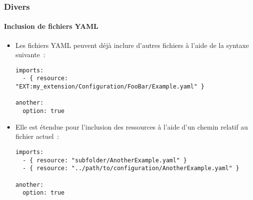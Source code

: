 
\begin{frame}[fragile]
	\frametitle{Divers}
	\framesubtitle{Inclusion de fichiers YAML}

	\lstset{basicstyle=\tiny\ttfamily}

	\begin{itemize}
		\item Les fichiers YAML peuvent déjà inclure d'autres fichiers à l'aide de la syntaxe suivante~:

\begin{lstlisting}
imports:
  - { resource: "EXT:my_extension/Configuration/FooBar/Example.yaml" }

another:
  option: true
\end{lstlisting}

		\item Elle est étendue pour l'inclusion des ressources à l'aide d'un chemin relatif au fichier actuel~:

\begin{lstlisting}
imports:
  - { resource: "subfolder/AnotherExample.yaml" }
  - { resource: "../path/to/configuration/AnotherExample.yaml" }

another:
  option: true
\end{lstlisting}

	\end{itemize}

\end{frame}

